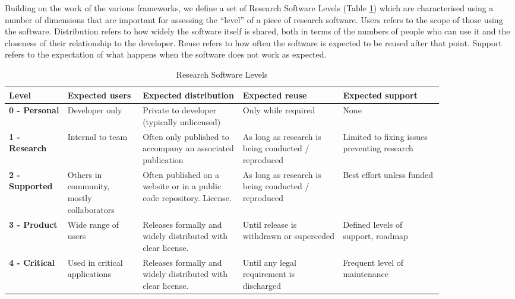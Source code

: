 \documentclass[conference]{IEEEtran}
\begin{document}
Building on the work of the various frameworks, we define a set of Research Software Levels (Table \ref{ResearchSoftwareLevels}) which are characterised using a number of dimensions that are important for assessing the ``level'' of a piece of research software. Users refers to the scope of those using the software. Distribution refers to how widely the software itself is shared, both in terms of the numbers of people who can use it and the closeness of their relationship to the developer. Reuse refers to how often the software is expected to be reused after that point. Support refers to the expectation of what happens when the software does not work as expected.

{\renewcommand{\arraystretch}{2}
\begin{table}[htbp]
\caption{Research Software Levels}
\begin{center}
\begin{tabular}{|p{0.1\linewidth}|p{0.15\linewidth}|p{0.2\linewidth}|p{0.2\linewidth}|p{0.2\linewidth}|}
\hline
\textbf{Level} & \textbf{Expected users} & \textbf{Expected distribution} & \textbf{Expected reuse} & \textbf{Expected support} \\
\hline
\textbf{0 - Personal} &
Developer only &
Private to developer (typically unlicensed) &
Only while required &
None \\
\hline
\textbf{1 - Research} &
Internal to team & 
Often only published to accompany an associated publication &
As long as research is being conducted / reproduced &
Limited to fixing issues preventing research \\
\hline
\textbf{2 - Supported} &
Others in community, mostly collaborators &
Often published on a website or in a public code repository. License. &
As long as research is being conducted / reproduced &
Best effort unless funded \\
\hline
\textbf{3 - Product} &
Wide range of users  &
Releases formally and widely distributed with clear license. &
Until release is withdrawn or superceded &
Defined levels of support, roadmap \\
\hline
\textbf{4 - Critical} &
Used in critical applications &
Releases formally and widely distributed with clear license. &
Until any legal requirement is discharged &
Frequent level of maintenance \\
\hline
\end{tabular}
\label{ResearchSoftwareLevels}
\end{center}
\end{table}
}
\end{document}
